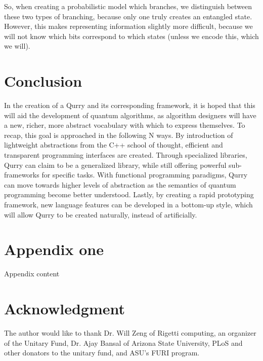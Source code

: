\documentclass[journal]{IEEEtran}
\begin{document}
 So, when creating a probabilistic model which branches, we distinguish between these two types of branching, because only one truly creates an entangled state.
 However, this makes representing information slightly more difficult, because we will not know which bits correspond to which states (unless we encode this, which we will).

\section{Conclusion}

In the creation of a Qurry and its corresponding framework, it is hoped that this will aid the development of quantum algorithms, as algorithm designers will have a new, richer, more abstract vocabulary with which to express themselves.
To recap, this goal is approached in the following N ways.
By introduction of lightweight abstractions from the C++ school of thought, efficient and transparent programming interfaces are created.
Through specialized libraries, Qurry can claim to be a generalized library, while still offering powerful sub-frameworks for specific tasks.
With functional programming paradigms, Qurry can move towards higher levels of abstraction as the semantics of quantum programming become better understood.
Lastly, by creating a rapid prototyping framework, new language features can be developed in a bottom-up style, which will allow Qurry to be created naturally, instead of artificially.


 \appendices
 \section{Appendix one}
Appendix content

\section*{Acknowledgment}

The author would like to thank Dr. Will Zeng of Rigetti computing, an organizer of the Unitary Fund, Dr. Ajay Bansal of Arizona State University, PLoS and other donators to the unitary fund, and ASU's FURI program.

\ifCLASSOPTIONcaptionsoff
  \newpage
\fi

\end{document}
